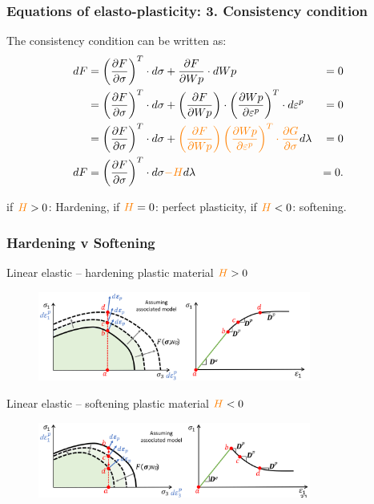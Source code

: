 \documentclass[handout]{beamer}
\begin{document}
\begin{frame}
\frametitle{Equations of elasto-plasticity: 3. Consistency condition}
The consistency condition can be written as:
	\begin{align*}
	dF & = \left(\frac{\partial F}{\partial \sigma}\right)^T \cdot d \sigma + \frac{\partial F}{\partial Wp}\cdot dWp & = 0 \\
	 & = \left(\frac{\partial F}{\partial \sigma}\right)^T \cdot d \sigma + \left(\frac{\partial F}{\partial Wp}\right)\cdot \left(\frac{\partial Wp}{\partial \varepsilon^p}\right)^T\cdot d \varepsilon^p & = 0 \\
	 & = \left(\frac{\partial F}{\partial \sigma}\right)^T \cdot d \sigma + \textcolor{orange}{\left(\frac{\partial F}{\partial Wp}\right)\left(\frac{\partial Wp}{\partial \varepsilon^p}\right)^T\cdot\frac{\partial G}{\partial 	\sigma}} d\lambda  & = 0 \\
	dF & = \left(\frac{\partial F}{\partial \sigma}\right)^T \cdot d \sigma \textcolor{orange}{-H} d\lambda & = 0.
	\end{align*}

	if $\textcolor{orange}{H} > 0$: Hardening, if $\textcolor{orange}{H} = 0$: perfect plasticity, if $\textcolor{orange}{H} < 0$: softening.
\end{frame}


\begin{frame}
\frametitle{Hardening v Softening}
Linear elastic – hardening plastic material  $\textcolor{orange}{H} > 0$
\begin{figure}
	\includegraphics[width=0.8\textwidth]{figs/hardening-plastic.png}
\end{figure}
Linear elastic – softening plastic material  $\textcolor{orange}{H} < 0$
\begin{figure}
	\includegraphics[width=0.8\textwidth]{figs/softening-plastic.png}
\end{figure}
\end{frame}
\end{document}
